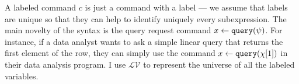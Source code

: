 % 
%
 A labeled command $c$ is just a command with a label --- we assume that labels are unique so that they can help to identify uniquely every subexpression. 
 The main novelty of the syntax is the query request command $\mathrel{ x \leftarrow {\tt query}(\psi) }$. 
 For instance, if a data analyst wants to ask a simple linear query that returns the first element of the row, 
 they can simply use the command $ \mathrel{ x \leftarrow {\tt query}(\chi[1]) }$ in their data analysis program.
%
I use 
$\mathcal{LV}$ to represent the universe of all the labeled variables.
 